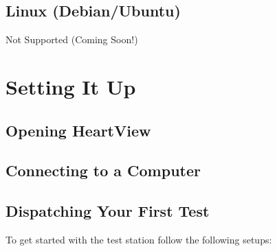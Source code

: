 \documentclass[11pt,fleqn]{book} %
\begin{document}
\subsection{Linux (Debian/Ubuntu)}

Not Supported (Coming Soon!)


\section{Setting It Up}

\subsection{Opening HeartView}
\subsection{Connecting to a Computer}
\subsection{Dispatching Your First Test}

To get started with the test station follow the following setups:\\
\end{document}
